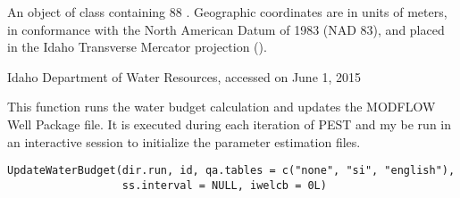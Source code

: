 \documentclass[a4paper]{book}
\begin{document}
%
\begin{Format}
An object of  class containing 88 .
Geographic coordinates are in units of meters, in conformance with the North American Datum of 1983 (NAD 83), and placed in the
Idaho Transverse Mercator projection ().
\end{Format}
%
\begin{Source}\relax
Idaho Department of Water Resources, accessed on June 1, 2015
\end{Source}
%
\begin{Examples}
\end{Examples}
%
\begin{Description}\relax
This function runs the water budget calculation and updates the MODFLOW Well Package file.
It is executed during each iteration of PEST and my be run in an interactive \R{} session to initialize the parameter estimation files.
\end{Description}
%
\begin{Usage}
\begin{verbatim}
UpdateWaterBudget(dir.run, id, qa.tables = c("none", "si", "english"),
                  ss.interval = NULL, iwelcb = 0L)
\end{verbatim}
\end{Usage}
%
\end{document}
